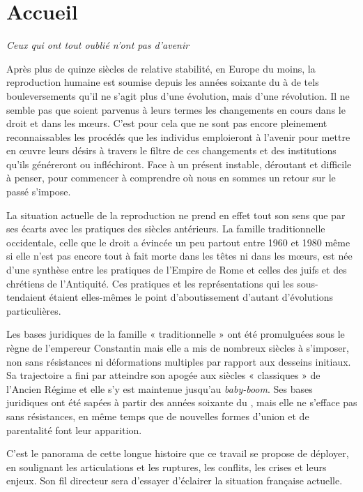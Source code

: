 

\chapter{Accueil}

\emph{Ceux qui ont tout oublié n'ont pas d'avenir}





Après plus de quinze siècles de relative stabilité, en Europe du moins, la reproduction humaine
est soumise depuis les années soixante du  à de tels bouleversements
qu'il ne s'agit plus d'une évolution, mais d'une révolution. Il
ne semble pas que soient  parvenus à leurs termes les changements en
cours dans le droit et dans les mœurs. C'est pour cela que ne sont pas
encore pleinement reconnaissables les procédés que les individus emploieront
à l'avenir pour mettre en œuvre leurs désirs à travers le filtre
de ces changements et des institutions qu'ils généreront ou infléchiront.
Face à un présent instable, déroutant et difficile à penser, pour commencer à
comprendre où nous en sommes
 un retour sur le passé s'impose.

La situation actuelle de la reproduction ne prend en
effet tout son sens que par ses écarts avec les pratiques des siècles antérieurs.
La famille traditionnelle occidentale, celle que le droit a évincée un peu partout entre 1960 et
1980 même si elle n'est pas encore tout à fait morte dans les têtes ni dans les mœurs, est
née d'une synthèse entre les pratiques de l'Empire de Rome et celles des
juifs et des chrétiens de l'Antiquité. Ces pratiques et les représentations
qui les sous-tendaient étaient elles-mêmes le point d'aboutissement
d'autant d'évolutions particulières.

Les bases juridiques de la famille « traditionnelle » ont été promulguées sous le règne
de l'empereur Constantin mais elle a mis de nombreux
siècles à s'imposer, non sans résistances ni déformations multiples par
rapport aux desseins initiaux. Sa trajectoire a fini par atteindre son apogée aux
siècles « classiques » de l'Ancien Régime et elle s'y est maintenue jusqu'au
\emph{baby-boom}. Ses bases juridiques ont été sapées à partir des années soixante du , mais elle ne s'efface pas sans résistances, en même temps que de nouvelles formes d'union et de parentalité font leur apparition.

C'est le panorama de cette longue histoire que ce travail se propose de déployer, en soulignant les articulations et les ruptures, les
conflits, les crises et leurs enjeux. Son fil directeur sera d'essayer d'éclairer la situation française actuelle.

